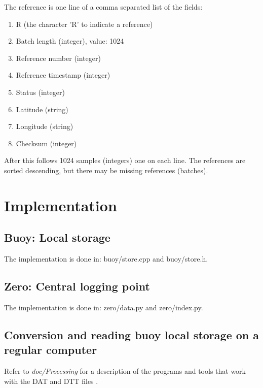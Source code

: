\documentclass[a4paper]{article}
\begin{document}
\begin{multicols}{2}
  The reference is one line of a comma separated list of the fields: \\
  \begin{enumerate}
    \item R (the character 'R' to indicate a reference)
    \item Batch length (integer), value: 1024
    \item Reference number (integer)
    \item Reference timestamp (integer)
    \item Status (integer)
    \item Latitude (string)
    \item Longitude (string)
    \item Checksum (integer)
  \end{enumerate}

  After this follows 1024 samples (integers) one on each line. The
  references are sorted descending, but there may be missing references
  (batches).

  \section{Implementation}
  \subsection{Buoy: Local storage}
  The implementation is done in: buoy/store.cpp and buoy/store.h.

  \subsection{Zero: Central logging point}
  The implementation is done in: zero/data.py and zero/index.py.
  \subsection{Conversion and reading buoy local storage on a regular
  computer}
  Refer to \textit{doc/Processing} for a description of the programs and tools
    that work with the DAT and DTT files \cite{processing}.

\vspace{5em}
\printbibliography
\end{multicols}
\end{document}
